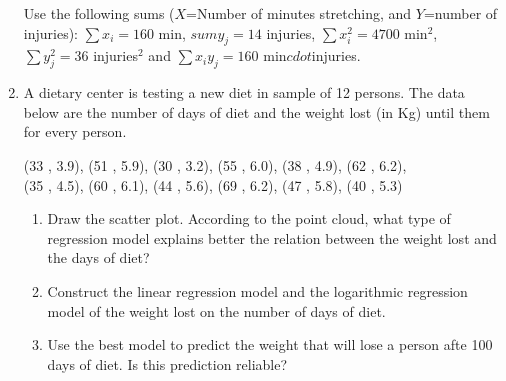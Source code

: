 \begin{enumerate}[leftmargin=*,resume]
Use the following sums ($X$=Number of minutes stretching, and $Y$=number of injuries):
$\sum x_i = 160$ min, $sum y_j=14$ injuries, $\sum x_i^2= 4700$ min$^2$, $\sum y_j^2=36$ injuries$^2$ and $\sum
x_iy_j=160$  min$cdot$injuries.

\item A dietary center is testing a new diet in sample of 12 persons. 
The data below are the number of days of diet and the weight lost (in Kg) until them for every person.  
\begin{center}
(33 , 3.9), (51 , 5.9), (30 , 3.2), (55 , 6.0), (38 , 4.9), (62 , 6.2),\\
(35 , 4.5), (60 , 6.1), (44 , 5.6), (69 , 6.2), (47 , 5.8), (40 , 5.3)
\end{center}
\begin{enumerate}
\item Draw the scatter plot. According to the point cloud, what type of regression model explains better the relation
between the weight lost and the days of diet?
\item Construct the linear regression model and the logarithmic regression model of the weight lost on the number of
days of diet.
\item Use the best model to predict the weight that will lose a person afte 100 days of diet. 
Is this prediction reliable?
\end{enumerate}


\end{enumerate}

